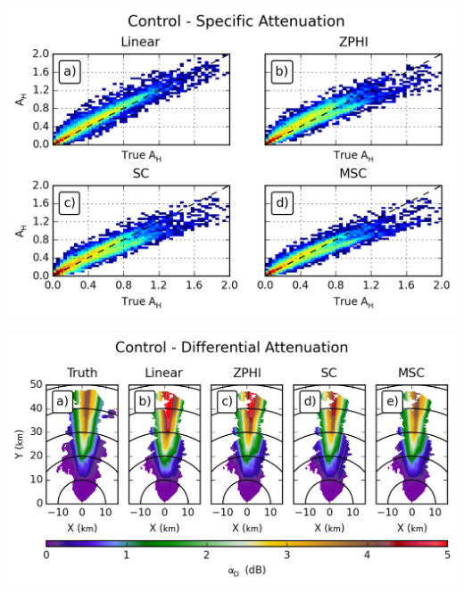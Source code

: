 \documentclass[red]{beamer}
\begin{document}
\begin{frame}
    \begin{center}
        \includegraphics[scale=0.7]{figures/C_Control_Specific_Attenuation_H_scatter}
    \end{center}
\end{frame}

\begin{frame}
    \begin{center}
        \includegraphics[scale=0.7]{figures/C_Control_Differential_Attenuation}
    \end{center}
\end{frame}
\end{document}
